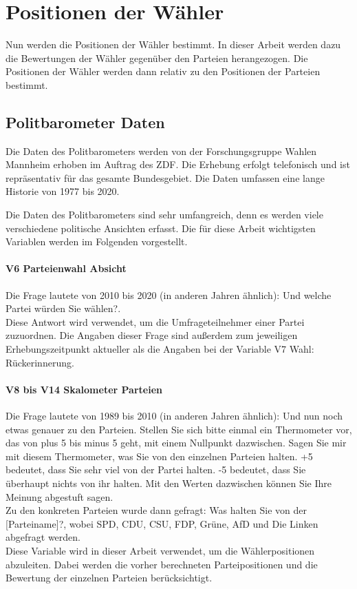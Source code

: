 \section{Positionen der Wähler}\label{Sec-Wählerpositionen}

Nun werden die Positionen der Wähler bestimmt. In dieser Arbeit werden dazu die Bewertungen der Wähler gegenüber den Parteien herangezogen. Die Positionen der Wähler werden dann relativ zu den Positionen der Parteien bestimmt.

\subsection{Politbarometer Daten}
Die Daten des Politbarometers \citep{politbarometer} werden von der Forschungsgruppe Wahlen Mannheim erhoben im Auftrag des ZDF. Die Erhebung erfolgt telefonisch und ist repräsentativ für das gesamte Bundesgebiet. Die Daten umfassen eine lange Historie von 1977 bis 2020.

Die Daten des Politbarometers sind sehr umfangreich, denn es werden viele verschiedene politische Ansichten erfasst.
Die für diese Arbeit wichtigsten Variablen werden im Folgenden vorgestellt.

\paragraph{V6 Parteienwahl Absicht}
Die Frage lautete von 2010 bis 2020 (in anderen Jahren ähnlich): \glqq Und welche Partei würden Sie wählen?\grqq. \citep[Variablendokumentation, S.\,12]{politbarometer}\\
Diese Antwort wird verwendet, um die Umfrageteilnehmer einer Partei zuzuordnen. Die Angaben dieser Frage sind außerdem zum jeweiligen Erhebungszeitpunkt aktueller als die Angaben bei der Variable \glqq V7 Wahl: Rückerinnerung\grqq.

\paragraph{V8 bis V14 Skalometer Parteien}
Die Frage lautete von 1989 bis 2010 (in anderen Jahren ähnlich): \glqq Und nun noch etwas genauer zu den Parteien. Stellen Sie sich bitte einmal ein Thermometer vor, das von plus 5 bis minus 5 geht, mit einem Nullpunkt dazwischen. Sagen Sie mir mit diesem Thermometer, was Sie von den einzelnen Parteien halten. +5 bedeutet, dass Sie sehr viel von der Partei halten. -5 bedeutet, dass Sie überhaupt nichts von ihr halten. Mit den Werten dazwischen können Sie Ihre Meinung abgestuft sagen.\grqq\\
Zu den konkreten Parteien wurde dann gefragt: \glqq Was halten Sie von der [Parteiname]?\grqq, wobei SPD, CDU, CSU, FDP, Grüne, AfD und Die Linken abgefragt werden. \citep[Variablendokumentation, S.\,28-29]{politbarometer}\\
Diese Variable wird in dieser Arbeit verwendet, um die Wählerpositionen abzuleiten. Dabei werden die vorher berechneten Parteipositionen und die Bewertung der einzelnen Parteien berücksichtigt.

